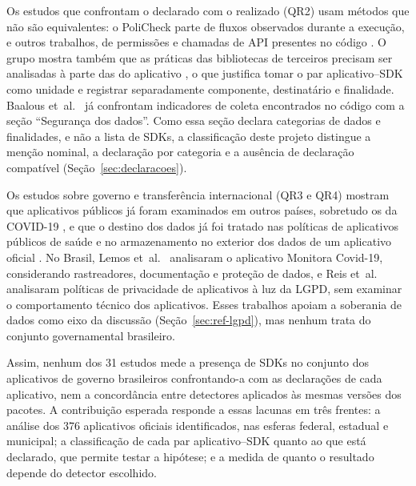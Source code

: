 Os estudos que confrontam o declarado com o realizado (QR2) usam métodos que não são equivalentes: o PoliCheck \cite{andow2020} parte de fluxos observados durante a execução, e outros trabalhos, de permissões e chamadas de API presentes no código \cite{tu2024}. O grupo mostra também que as práticas das bibliotecas de terceiros precisam ser analisadas à parte das do aplicativo \cite{zhao2023,verderame2020}, o que justifica tomar o par aplicativo--SDK como unidade e registrar separadamente componente, destinatário e finalidade. Baalous et~al.~\cite{baalous2025} já confrontam indicadores de coleta encontrados no código com a seção ``Segurança dos dados''. Como essa seção declara categorias de dados e finalidades, e não a lista de SDKs, a classificação deste projeto distingue a menção nominal, a declaração por categoria e a ausência de declaração compatível (Seção~\ref{sec:declaracoes}).

Os estudos sobre governo e transferência internacional (QR3 e QR4) mostram que aplicativos públicos já foram examinados em outros países, sobretudo os da COVID-19 \cite{kouliaridis2021,samhi2021,hatamian2021,flood2022,jordanoski2023,serrano2024}, e que o destino dos dados já foi tratado nas políticas de aplicativos públicos de saúde \cite{jiang2023} e no armazenamento no exterior dos dados de um aplicativo oficial \cite{sterling2024}. No Brasil, Lemos et~al.~\cite{lemos2022} analisaram o aplicativo Monitora Covid-19, considerando rastreadores, documentação e proteção de dados, e Reis et~al.~\cite{reis2023} analisaram políticas de privacidade de aplicativos à luz da LGPD, sem examinar o comportamento técnico dos aplicativos. Esses trabalhos apoiam a soberania de dados como eixo da discussão (Seção~\ref{sec:ref-lgpd}), mas nenhum trata do conjunto governamental brasileiro.

Assim, nenhum dos 31 estudos mede a presença de SDKs no conjunto dos aplicativos de governo brasileiros confrontando-a com as declarações de cada aplicativo, nem a concordância entre detectores aplicados às mesmas versões dos pacotes. A contribuição esperada responde a essas lacunas em três frentes: a análise dos 376 aplicativos oficiais identificados, nas esferas federal, estadual e municipal; a classificação de cada par aplicativo--SDK quanto ao que está declarado, que permite testar a hipótese; e a medida de quanto o resultado depende do detector escolhido.

